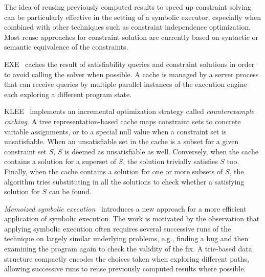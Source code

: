 

The idea of reusing previously computed results to speed up constraint solving can be particularly effective in the setting of a symbolic executor, especially when combined with other techniques such as constraint independence optimization. Most reuse approaches for constraint solution are currently based on syntactic or semantic equivalence of the constraints.

{\sc EXE}~\cite{EXE-CCS06} caches the result of satisfiability queries and constraint solutions in order to avoid calling the solver when possible. A cache is managed by a server process that can receive queries by multiple parallel instances of the execution engine each exploring a different program state.

{\sc KLEE}~\cite{KLEE-OSDI08} implements an incremental optimization strategy called {\em counterexample caching}. A tree representation-based cache maps constraint sets to concrete variable assignments, or to a special null value when a constraint set is unsatisfiable. When an unsatisfiable set in the cache is a subset for a given constraint set $S$, $S$ is deemed as unsatisfiable as well. Conversely, when the cache contains a solution for a superset of $S$, the solution trivially satisfies $S$ too. Finally, when the cache contains a solution for one or more subsets of $S$, the algorithm tries substituting in all the solutions to check whether a satisfying solution for $S$ can be found.

{\em Memoized symbolic execution}~\cite{MEMO-ISSTA12} introduces a new approach for a more efficient application of symbolic execution. The work is motivated by the observation that applying symbolic execution often requires several successive runs of the technique on largely similar underlying problems, e.g., finding a bug and then examining the program again to check the validity of the fix. A trie-based data structure compactly encodes the choices taken when exploring different paths, allowing successive runs to reuse previously computed results where possible.

